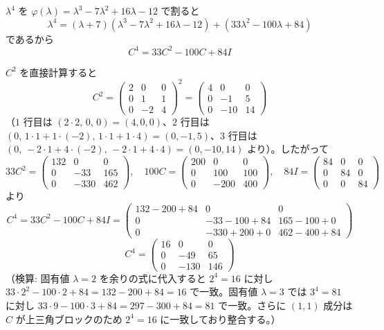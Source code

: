 \documentclass[a4paper,11pt]{article}
\begin{document}
$\lambda^{4}$ を $\varphi(\lambda) = \lambda^{3} - 7\lambda^{2} + 16\lambda - 12$ で割ると
\[
\lambda^{4} = (\lambda + 7)(\lambda^{3} - 7\lambda^{2} + 16\lambda - 12) + (33\lambda^{2} - 100\lambda + 84)
\]
であるから
\[
C^{4} = 33C^{2} - 100C + 84I
\]

$C^{2}$ を直接計算すると
\[
C^{2} = \begin{pmatrix} 2 & 0 & 0 \\ 0 & 1 & 1 \\ 0 & -2 & 4 \end{pmatrix}^{2} = \begin{pmatrix} 4 & 0 & 0 \\ 0 & -1 & 5 \\ 0 & -10 & 14 \end{pmatrix}
\]
（$1$ 行目は $(2\cdot2,\,0,\,0)=(4,0,0)$、$2$ 行目は $(0,\,1\cdot1+1\cdot(-2),\,1\cdot1+1\cdot4)=(0,-1,5)$、$3$ 行目は $(0,\,-2\cdot1+4\cdot(-2),\,-2\cdot1+4\cdot4)=(0,-10,14)$ より）。したがって
\[
33C^{2} = \begin{pmatrix} 132 & 0 & 0 \\ 0 & -33 & 165 \\ 0 & -330 & 462 \end{pmatrix}, \quad
100C = \begin{pmatrix} 200 & 0 & 0 \\ 0 & 100 & 100 \\ 0 & -200 & 400 \end{pmatrix}, \quad
84I = \begin{pmatrix} 84 & 0 & 0 \\ 0 & 84 & 0 \\ 0 & 0 & 84 \end{pmatrix}
\]
より
\[
C^{4} = 33C^{2} - 100C + 84I = \begin{pmatrix} 132-200+84 & 0 & 0 \\ 0 & -33-100+84 & 165-100+0 \\ 0 & -330+200+0 & 462-400+84 \end{pmatrix}
\]
\[
\boxed{\; C^{4} = \begin{pmatrix} 16 & 0 & 0 \\ 0 & -49 & 65 \\ 0 & -130 & 146 \end{pmatrix} \;}
\]
（検算: 固有値 $\lambda=2$ を余りの式に代入すると $2^{4}=16$ に対し $33\cdot2^{2}-100\cdot2+84 = 132-200+84=16$ で一致。固有値 $\lambda=3$ では $3^{4}=81$ に対し $33\cdot9-100\cdot3+84=297-300+84=81$ で一致。さらに $(1,1)$ 成分は $C$ が上三角ブロックのため $2^{4}=16$ に一致しており整合する。）
\end{document}
